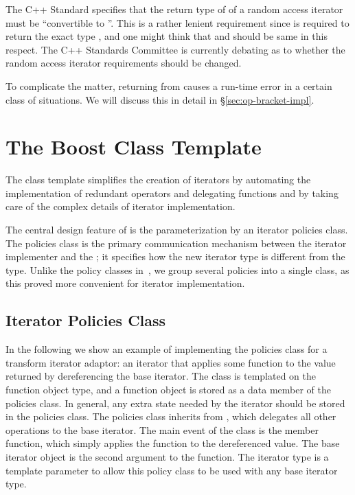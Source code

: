 \documentclass{netobjectdays}
\begin{document}
The C++ Standard specifies that the return type of 
of a random access iterator must be ``convertible to ''.  This
is a rather lenient requirement since  is required to
return the exact type , and one might think that
 and  should be same in this respect.
The C++ Standards Committee is currently debating as to whether the
random access iterator requirements should be changed.

To complicate the matter, returning  from 
causes a run-time error in a certain class of situations. We will
discuss this in detail in \S\ref{sec:op-bracket-impl}.




\section{The Boost  Class Template}

The  class template simplifies the creation
of iterators by automating the implementation of redundant operators
and delegating functions and by taking care of the complex details of
iterator implementation.

The central design feature of  is the
parameterization by an iterator policies class. The policies class is
the primary communication mechanism between the iterator implementer
and the ; it specifies how the new iterator
type is different from the  type. Unlike the policy classes
in~\cite{alexandrescu01:_modern_cpp_design}, we group several policies
into a single class, as this proved more convenient for iterator
implementation.

\subsection{Iterator Policies Class}

In the following we show an example of implementing the policies class
for a transform iterator adaptor: an iterator that applies some
function to the value returned by dereferencing the base iterator.
The  class is templated on the
function object type, and a function object is stored as a data member
of the policies class.  In general, any extra state needed by the
iterator should be stored in the policies class. The policies class
inherits from , which delegates
all other operations to the base iterator. The main event of the
 class is the
 member function, which simply applies the
function to the dereferenced value. The base iterator object is the
second argument to the  function. The iterator
type is a template parameter to allow this policy class to be used
with any base iterator type.
\end{document}
